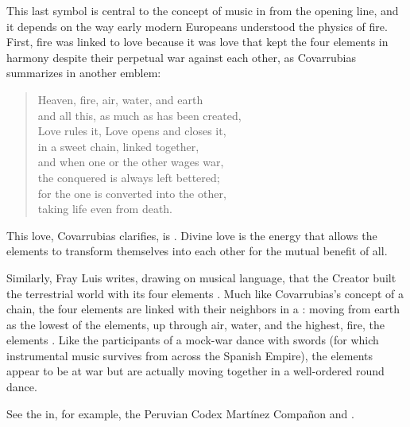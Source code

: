 
This last symbol is central to the concept of music in  from the opening line, and it depends on the way early
modern Europeans understood the physics of fire.
First, fire was linked to love because it was love that kept the four
elements in harmony despite their perpetual war against each other, as
Covarrubias summarizes in another emblem:
\begin{quoting}
    \begin{verse}
        Heaven, fire, air, water, and earth\\
        and all this, as much as has been created,\\
        Love rules it, Love opens and closes it,\\
        in a sweet chain, linked together,\\
        and when one or the other wages war,\\
        the conquered is always left bettered;\\
        for the one is converted into the other,\\
        taking life even from death.%
            \Autocite[ I, ]
            {Covarrubias:Emblemas}
    \end{verse}
\end{quoting}
This love, Covarrubias clarifies, is .
Divine love is the energy that allows the elements to transform themselves into
each other for the mutual benefit of all.


Similarly, Fray Luis writes, drawing on musical language, that the Creator
built the terrestrial world with its four elements .%
    \Autocite[204]{LuisdeGranada:Simbolo}
Much like Covarrubias's concept of a chain, the four elements are linked with
their neighbors in a : moving from
earth as the lowest of the elements, up through air, water, and the highest,
fire, the elements .
    \Autocite[204]{LuisdeGranada:Simbolo}
Like the participants of a mock-war dance with swords (for which instrumental
music survives from across the Spanish Empire), the elements appear to be at
war but are actually moving together in a well-ordered round dance.%
\begin{Footnote}
    See the  in, for example, the Peruvian Codex
    Martínez Compañon and \autocite{MartinyColl:HuertoAmeno}.
\end{Footnote}

